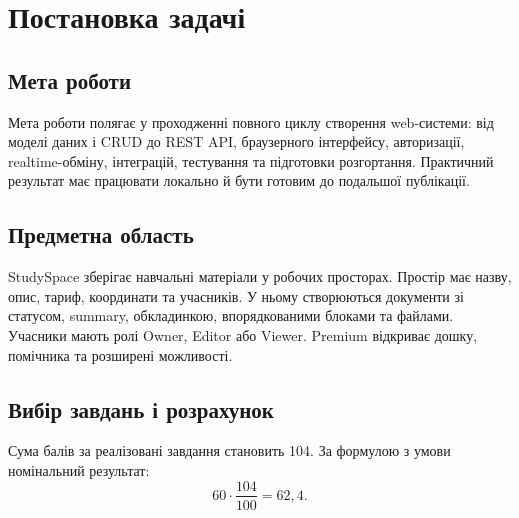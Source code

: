 \documentclass[12pt,a4paper]{article}
\begin{document}
\newpage
\tableofcontents
\newpage

\section{Постановка задачі}
\subsection{Мета роботи}
Мета роботи полягає у проходженні повного циклу створення web-системи: від моделі даних і
CRUD до REST API, браузерного інтерфейсу, авторизації, realtime-обміну,
інтеграцій, тестування та підготовки розгортання. Практичний результат має
працювати локально й бути готовим до подальшої публікації.

\subsection{Предметна область}
StudySpace зберігає навчальні матеріали у робочих просторах. Простір має
назву, опис, тариф, координати та учасників. У ньому створюються документи зі
статусом, summary, обкладинкою, впорядкованими блоками та файлами. Учасники
мають ролі Owner, Editor або Viewer. Premium відкриває дошку, помічника та
розширені можливості.

\subsection{Вибір завдань і розрахунок}
Сума балів за реалізовані завдання становить 104. За формулою з умови
номінальний результат:
\[60\cdot\frac{104}{100}=62{,}4.\]
\end{document}
